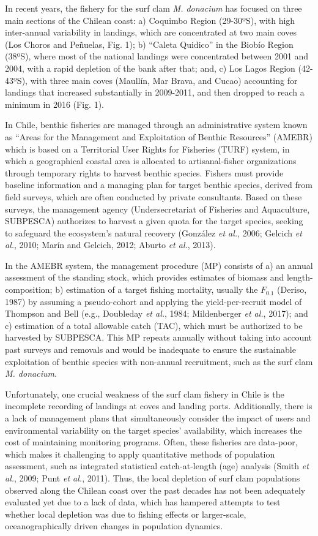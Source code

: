 \documentclass[12pt]{article}
\begin{document}
In recent years, the fishery for the surf clam \emph{M. donacium} has
focused on three main sections of the Chilean coast: a) Coquimbo Region
(29-30ºS), with high inter-annual variability in landings, which are
concentrated at two main coves (Los Choros and Peñuelas, Fig. 1); b)
``Caleta Quidico'' in the Biobío Region (38ºS), where most of the
national landings were concentrated between 2001 and 2004, with a rapid
depletion of the bank after that; and, c) Los Lagos Region (42-43ºS),
with three main coves (Maullín, Mar Brava, and Cucao) accounting for
landings that increased substantially in 2009-2011, and then dropped to
reach a minimum in 2016 (Fig. 1).

In Chile, benthic fisheries are managed through an administrative system
known as ``Areas for the Management and Exploitation of Benthic
Resources'' (AMEBR) which is based on a Territorial User Rights for
Fisheries (TURF) system, in which a geographical coastal area is
allocated to artisanal-fisher organizations through temporary rights to
harvest benthic species. Fishers must provide baseline information and a
managing plan for target benthic species, derived from field surveys,
which are often conducted by private consultants. Based on these
surveys, the management agency (Undersecretariat of Fisheries and
Aquaculture, SUBPESCA) authorizes to harvest a given quota for the
target species, seeking to safeguard the ecosystem's natural recovery
(González \emph{et al.}, 2006; Gelcich \emph{et al.}, 2010; Marín and
Gelcich, 2012; Aburto \emph{et al.}, 2013).

In the AMEBR system, the management procedure (MP) consists of a) an
annual assessment of the standing stock, which provides estimates of
biomass and length-composition; b) estimation of a target fishing
mortality, usually the \(F_{0.1}\) (Deriso, 1987) by assuming a
pseudo-cohort and applying the yield-per-recruit model of Thompson and
Bell (e.g., Doubleday \emph{et al.}, 1984; Mildenberger \emph{et al.},
2017); and c) estimation of a total allowable catch (TAC), which must be
authorized to be harvested by SUBPESCA. This MP repeats annually without
taking into account past surveys and removals and would be inadequate to
ensure the sustainable exploitation of benthic species with non-annual
recruitment, such as the surf clam \emph{M. donacium}.

Unfortunately, one crucial weakness of the surf clam fishery in Chile is
the incomplete recording of landings at coves and landing ports.
Additionally, there is a lack of management plans that simultaneously
consider the impact of users and environmental variability on the target
species' availability, which increases the cost of maintaining
monitoring programs. Often, these fisheries are data-poor, which makes
it challenging to apply quantitative methods of population assessment,
such as integrated statistical catch-at-length (age) analysis (Smith
\emph{et al.}, 2009; Punt \emph{et al.}, 2011). Thus, the local
depletion of surf clam populations observed along the Chilean coast over
the past decades has not been adequately evaluated yet due to a lack of
data, which has hampered attempts to test whether local depletion was
due to fishing effects or larger-scale, oceanographically driven changes
in population dynamics.
\end{document}
